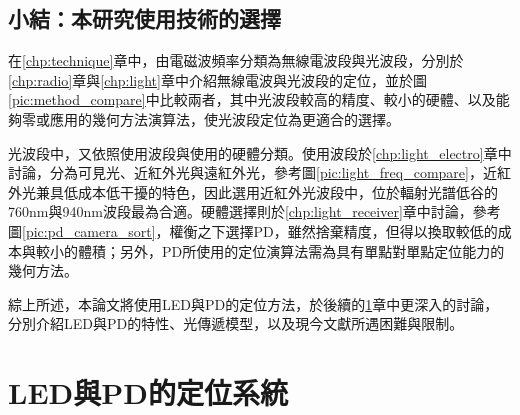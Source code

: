                 


        
                

        \subsection{小結：本研究使用技術的選擇}
        

        在\ref{chp:technique}章中，由電磁波頻率分類為無線電波段與光波段，分別於\ref{chp:radio}章與\ref{chp:light}章中介紹無線電波與光波段的定位，並於圖\ref{pic:method_compare}中比較兩者，其中光波段較高的精度、較小的硬體、以及能夠零或應用的幾何方法演算法，使光波段定位為更適合的選擇。

        光波段中，又依照使用波段與使用的硬體分類。使用波段於\ref{chp:light_electro}章中討論，分為可見光、近紅外光與遠紅外光，參考圖\ref{pic:light_freq_compare}，近紅外光兼具低成本低干擾的特色，因此選用近紅外光波段中，位於輻射光譜低谷的760nm與940nm波段最為合適。硬體選擇則於\ref{chp:light_receiver}章中討論，參考圖\ref{pic:pd_camera_sort}，權衡之下選擇PD，雖然捨棄精度，但得以換取較低的成本與較小的體積；另外，PD所使用的定位演算法需為具有單點對單點定位能力的幾何方法。
    
        
        綜上所述，本論文將使用LED與PD的定位方法，於後續的\ref{chp:LEDandPD}章中更深入的討論，分別介紹LED與PD的特性、光傳遞模型，以及現今文獻所遇困難與限制。


        

    

        

        

        

        


        

        

            

          
\section{LED與PD的定位系統}
\label{chp:LEDandPD}




